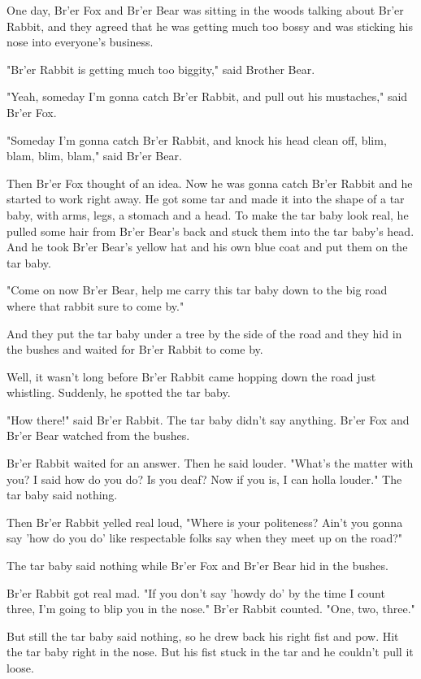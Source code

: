 One day, Br'er Fox and Br'er Bear was sitting in the woods talking about Br'er Rabbit, and they agreed that he was getting much too bossy and was sticking his nose into everyone's business.

"Br'er Rabbit is getting much too biggity," said Brother Bear.

"Yeah, someday I'm gonna catch Br'er Rabbit, and pull out his mustaches," said Br'er Fox.

"Someday I'm gonna catch Br'er Rabbit, and knock his head clean off, blim, blam, blim, blam," said Br'er Bear.

Then Br'er Fox thought of an idea. Now he was gonna catch Br'er Rabbit and he started to work right away. He got some tar and made it into the shape of a tar baby, with arms, legs, a stomach and a head. To make the tar baby look real, he pulled some hair from Br'er Bear's back and stuck them into the tar baby's head. And he took Br'er Bear's yellow hat and his own blue coat and put them on the tar baby.

"Come on now Br'er Bear, help me carry this tar baby down to the big road where that rabbit sure to come by."

And they put the tar baby under a tree by the side of the road and they hid in the bushes and waited for Br'er Rabbit to come by.

Well, it wasn't long before Br'er Rabbit came hopping down the road just whistling. Suddenly, he spotted the tar baby.

"How there!" said Br'er Rabbit. The tar baby didn't say anything. Br'er Fox and Br'er Bear watched from the bushes.

Br'er Rabbit waited for an answer. Then he said louder. "What's the matter with you? I said how do you do? Is you deaf? Now if you is, I can holla louder." The tar baby said nothing.

Then Br'er Rabbit yelled real loud, "Where is your politeness? Ain't you gonna say 'how do you do' like respectable folks say when they meet up on the road?"

The tar baby said nothing while Br'er Fox and Br'er Bear hid in the bushes.

Br'er Rabbit got real mad. "If you don't say 'howdy do' by the time I count three, I'm going to blip you in the nose." Br'er Rabbit counted. "One, two, three."

But still the tar baby said nothing, so he drew back his right fist and pow. Hit the tar baby right in the nose. But his fist stuck in the tar and he couldn't pull it loose.


